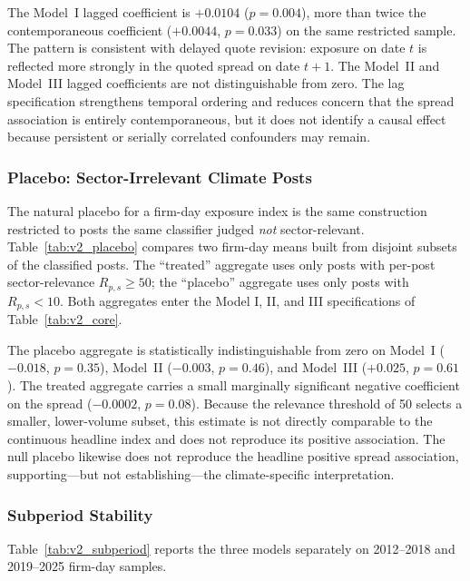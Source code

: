 \documentclass{article}
\theoremstyle{plain}
\begin{document}


The Model~I lagged coefficient is $+0.0104$ ($p=0.004$), more than twice the contemporaneous coefficient ($+0.0044$, $p=0.033$) on the same restricted sample. The pattern is consistent with delayed quote revision: exposure on date $t$ is reflected more strongly in the quoted spread on date $t{+}1$. The Model~II and Model~III lagged coefficients are not distinguishable from zero. The lag specification strengthens temporal ordering and reduces concern that the spread association is entirely contemporaneous, but it does not identify a causal effect because persistent or serially correlated confounders may remain.

\subsubsection{Placebo: Sector-Irrelevant Climate Posts}
\label{sec:results_placebo}

The natural placebo for a firm-day exposure index is the same construction restricted to posts the same classifier judged \emph{not} sector-relevant. Table~\ref{tab:v2_placebo} compares two firm-day means built from disjoint subsets of the classified posts. The ``treated'' aggregate uses only posts with per-post sector-relevance $R_{p,s}\geq 50$; the ``placebo'' aggregate uses only posts with $R_{p,s}<10$. Both aggregates enter the Model I, II, and III specifications of Table~\ref{tab:v2_core}.



The placebo aggregate is statistically indistinguishable from zero on Model~I ($-0.018$, $p=0.35$), Model~II ($-0.003$, $p=0.46$), and Model~III ($+0.025$, $p=0.61$). The treated aggregate carries a small marginally significant negative coefficient on the spread ($-0.0002$, $p=0.08$). Because the relevance threshold of 50 selects a smaller, lower-volume subset, this estimate is not directly comparable to the continuous headline index and does not reproduce its positive association. The null placebo likewise does not reproduce the headline positive spread association, supporting---but not establishing---the climate-specific interpretation.

\subsubsection{Subperiod Stability}
\label{sec:results_subperiod}

Table~\ref{tab:v2_subperiod} reports the three models separately on 2012--2018 and 2019--2025 firm-day samples.
\end{document}
